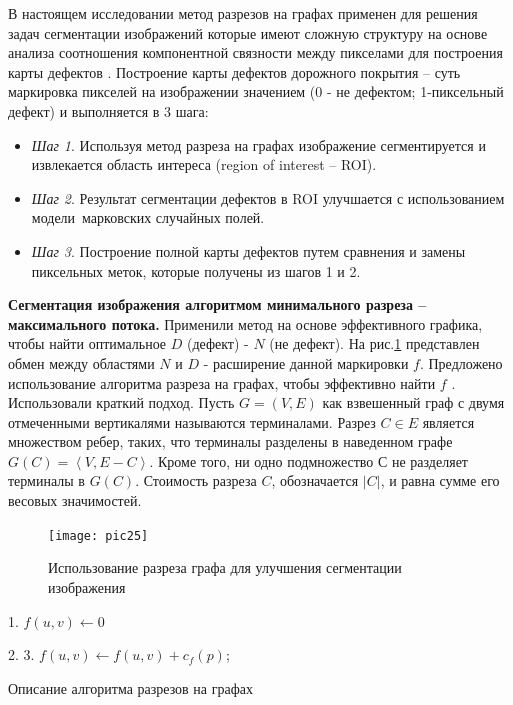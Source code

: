 \documentclass[a4paper,14pt]{extreport}
\begin{document}
В настоящем исследовании метод разрезов на графах применен для решения задач сегментации изображений которые имеют сложную структуру на основе анализа соотношения компонентной связности между пикселами для построения карты дефектов \cite{h144,h145}. Построение карты дефектов дорожного покрытия -- суть маркировка пикселей на изображении значением (0 - не дефектом; 1-пиксельный дефект) и выполняется в 3 шага:

\begin{itemize}
	\item \textit{Шаг 1}. Используя метод разреза на графах изображение сегментируется и извлекается область интереса (region of interest -- ROI).
\item \textit{Шаг 2}. Результат сегментации дефектов в ROI улучшается с использованием модели марковских случайных полей.
\item \textit{Шаг 3}. Построение полной карты дефектов путем сравнения и замены пиксельных меток, которые получены из шагов 1 и 2.
\end{itemize}

\textbf{Сегментация изображения алгоритмом минимального разреза -- максимального потока.} Применили метод на основе эффективного графика, чтобы найти оптимальное $D$ (дефект) - $N$ (не дефект). На рис.\ref{pic25} представлен обмен между областями $N$ и $D$ - расширение данной маркировки $f$. Предложено использование алгоритма разреза на графах, чтобы эффективно найти $f$ \cite{h13}. Использовали краткий подход. Пусть $G=\left(V,E\right)$ как взвешенный граф с двумя отмеченными вертикалями называются терминалами. Разрез $C \in E$ является множеством ребер, таких, что терминалы разделены в наведенном графе $G\left(C\right)=\left\langle V,E-C\right\rangle$. Кроме того, ни одно подмножество $С$ не разделяет терминалы в $G\left(C\right)$. Стоимость разреза $C$, обозначается $|C|$, и равна сумме его весовых значимостей.

\begin{figure}[ht!]
\centering
\texttt{[image: pic25]}
\caption{Использование разреза графа для улучшения сегментации изображения}
	\label{pic25}
		\end{figure} 

\begin{algorithm}[ht!]
		1. 
     {
		$f\left(u,v\right) \leftarrow 0$
		}
	
		2. 
		3. 
     {
		$f\left(u,v\right) \leftarrow f\left(u,v\right) +c_f\left(p\right) $;
		}		
  \caption{Описание алгоритма разрезов на графах} \label{alg3}
\end{algorithm}
\end{document}
